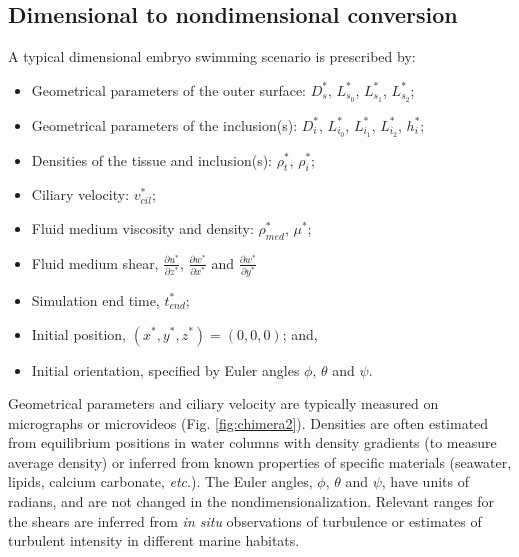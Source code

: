 \documentclass[10pt,a4paper]{article}
\def\p{\partial}
\def\etc{\emph{etc}.\xspace}
\begin{document}
\subsection{Dimensional to nondimensional conversion}
A typical dimensional embryo swimming scenario is prescribed by:
\begin{itemize}
	\item Geometrical parameters of the outer surface: $D^*_s$, $L^*_{s_0}$, $L^*_{s_1}$, $L^*_{s_2}$; 
	\item Geometrical parameters of the inclusion(s): $D^*_{i}$, $L^*_{i_0}$, $L^*_{i_1}$, $L^*_{i_2}$, $h^*_i$; 
	\item Densities of the tissue and inclusion(s): $\rho^*_t$, $\rho^*_{i}$; 
	\item Ciliary velocity: $v^*_{cil}$;
	\item Fluid medium viscosity and density: $\rho^*_{med}$, $\mu^*$;
	\item Fluid medium shear, $\frac{\p u^*}{\p z^*}$, $\frac{\p w^*}{\p x^*}$ and $\frac{\p w^*}{\p y^*}$
	\item Simulation end time, $t^*_{end}$;
	\item Initial position, $(x^*, y^*, z^*) = (0,0,0)$; and,
	\item Initial orientation, specified by Euler angles $\phi$, $\theta$ and $\psi$. 
\end{itemize}
Geometrical parameters and ciliary velocity are typically measured on micrographs or microvideos (Fig. \ref{fig:chimera2}).
Densities are often estimated from equilibrium positions in water columns with density gradients (to measure average density) or inferred from known properties of specific materials (seawater, lipids, calcium carbonate, \etc). 
The Euler angles, $\phi$, $\theta$ and $\psi$,  have units of radians, and are not changed in the nondimensionalization.
Relevant ranges for the shears are inferred from \textit{in situ} observations of turbulence or estimates of turbulent intensity in different marine habitats.
\end{document}
